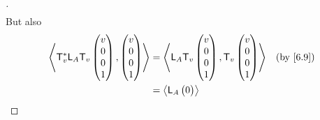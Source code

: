 \begin{proof}[]
\begin{align*}
  \end{align*}
  But also
  \begin{align*}
    \inn{\T_v^* \L_A \T_v\begin{pmatrix}
                             v \\
                             0 \\
                             0 \\
                             1
                           \end{pmatrix}, \begin{pmatrix}
                                            v \\
                                            0 \\
                                            0 \\
                                            1
                                          \end{pmatrix}} & = \inn{\L_A \T_v\begin{pmatrix}
                                                                             v \\
                                                                             0 \\
                                                                             0 \\
                                                                             1
                                                                           \end{pmatrix}, \T_v\begin{pmatrix}
                                                                                                v \\
                                                                                                0 \\
                                                                                                0 \\
                                                                                                1
                                                                                              \end{pmatrix}} &  & \by{6.9} \\
                                         & = \inn{\L_A\begin{pmatrix}
                                                          0 \\

\end{pmatrix}}
\end{align*}
\end{proof}
